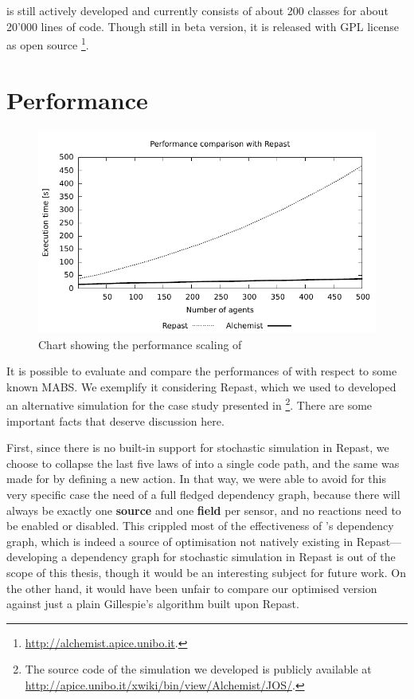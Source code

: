 \documentclass[12pt,a4paper,twoside,openright]{book}
\begin{document}
\alchemist{} is still actively developed and currently consists of about 200 classes for about 20'000 lines of code. Though still in beta version, it is released with GPL license as open source \footnote{\mbox{\url{http://alchemist.apice.unibo.it}}.}.

\chapter{Performance}
\begin{figure}[t]
    \includegraphics[width=0.999999\columnwidth]{img/jos-graph01}
    \caption{Chart showing the performance scaling of \alchemist{}}
    \label{img:repastperf}
\end{figure}

It is possible to evaluate and compare the performances of \alchemist{} with respect to some known MABS.
%
We exemplify it considering Repast, which we used to developed an alternative simulation for the case study presented in \footnote{The source code of the simulation we developed is publicly available at \mbox{\url{http://apice.unibo.it/xwiki/bin/view/Alchemist/JOS/}.}}. There are some important facts that deserve discussion here.

First, since there is no built-in support for stochastic simulation in Repast, we choose to collapse the last five laws of  into a single code path, and the same was made for \alchemist{} by defining a new action.
%
In that way, we were able to avoid for this very specific case the need of a full fledged dependency graph, because there will always be exactly one \textbf{source} and one \textbf{field} per sensor, and no reactions need to be enabled or disabled.
%
This crippled most of the effectiveness of \alchemist{}'s dependency graph, which is indeed a source of optimisation not natively existing in Repast---developing a dependency graph for stochastic simulation in Repast is out of the scope of this thesis, though it would be an interesting subject for future work.
%
On the other hand, it would have been unfair to compare our optimised version against just a plain Gillespie's algorithm built upon Repast.
\end{document}
